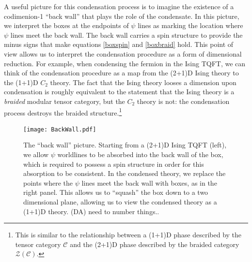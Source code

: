 \documentclass[12pt,a4paper]{article}
\newcommand{\mcz}{\mathcal{Z}}
\newcommand{\mcc}{\mathcal{C}}
\newcommand{\dave}[1]{{\color{ao(english)}\footnotesize{(DA) #1}}}
\newcommand{\ethan}[1]{{\color{amethyst}\footnotesize{(EL) #1}}}
\begin{document}
A useful picture for this condensation process is to imagine the existence of a codimenion-1 ``back wall'' that plays the role of the condensate. In this picture, we interpret the boxes at the endpoints of $\psi$ lines as marking the location where $\psi$ lines meet the back wall. The back wall carries a spin structure to provide the minus signs that make equations \eqref{boxspin} and \eqref{boxbraid} hold. This point of view allows us to interpret the condensation procedure as a form of dimensional reduction. For example, when condensing the fermion in the Ising TQFT, we can think of the condensation procedure as a map from the (2+1)D Ising theory to the (1+1)D $C_2$ theory. The fact that the Ising theory looses a dimension upon condensation is roughly equivalent to the statement that the Ising theory is a {\it braided} modular tensor category, but the $C_2$ theory is not: the condensation process destroys the braided structure.\footnote{This is similar to the relationship between a (1+1)D phase described by the tensor category $\mcc$ and the (2+1)D phase described by the braided category $\mcz(\mcc)$.}

\begin{figure}
  \centering
    \texttt{[image: BackWall.pdf]}
      \caption{The ``back wall'' picture. Starting from a (2+1)D Ising TQFT (left), we allow $\psi$ worldlines to be absorbed into the back wall of the box, which is required to possess a spin structure in order for this absorption to be consistent. In the condensed theory, we replace the points where the $\psi$ lines meet the back wall with boxes, as in the right panel. This allows us to ``squash'' the box down to a two dimensional plane, allowing us to view the condensed theory as a (1+1)D theory. \dave{need to number things.}.}
\end{figure}
\end{document}

